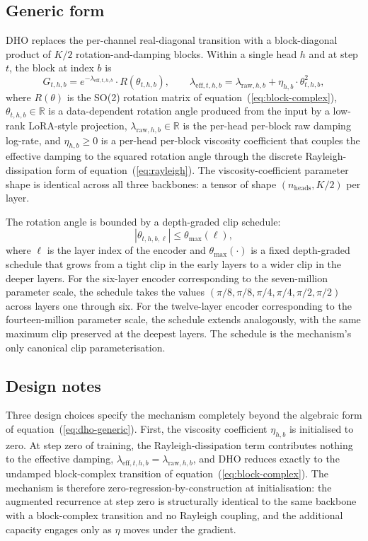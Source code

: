 \subsection{Generic form}

DHO replaces the per-channel real-diagonal transition with a
block-diagonal product of $K/2$ rotation-and-damping blocks. Within
a single head $h$ and at step $t$, the block at index $b$ is
\begin{equation}\label{eq:dho-generic}
G_{t, h, b} = e^{-\lambda_{\mathrm{eff}, t, h, b}} \cdot R(\theta_{t, h, b}),
\qquad
\lambda_{\mathrm{eff}, t, h, b} = \lambda_{\mathrm{raw}, h, b} + \eta_{h, b} \cdot \theta_{t, h, b}^{2},
\end{equation}
where $R(\theta)$ is the SO(2) rotation matrix of
equation~(\ref{eq:block-complex}), $\theta_{t, h, b} \in \mathbb{R}$
is a data-dependent rotation angle produced from the input by a
low-rank LoRA-style projection, $\lambda_{\mathrm{raw}, h, b} \in \mathbb{R}$
is the per-head per-block raw damping log-rate, and
$\eta_{h, b} \ge 0$ is a per-head per-block viscosity coefficient
that couples the effective damping to the squared rotation angle
through the discrete Rayleigh-dissipation form of
equation~(\ref{eq:rayleigh}). The viscosity-coefficient parameter
shape is identical across all three backbones: a tensor of shape
$(n_{\mathrm{heads}}, K/2)$ per layer.

The rotation angle is bounded by a depth-graded clip schedule:
\begin{equation}\label{eq:dho-clip}
|\theta_{t, h, b, \ell}| \le \theta_{\max}(\ell),
\end{equation}
where $\ell$ is the layer index of the encoder and
$\theta_{\max}(\cdot)$ is a fixed depth-graded schedule that grows
from a tight clip in the early layers to a wider clip in the deeper
layers. For the six-layer encoder corresponding to the seven-million
parameter scale, the schedule takes the values
$(\pi/8, \pi/8, \pi/4, \pi/4, \pi/2, \pi/2)$ across layers one
through six. For the twelve-layer encoder corresponding to the
fourteen-million parameter scale, the schedule extends analogously,
with the same maximum clip preserved at the deepest layers. The
schedule is the mechanism's only canonical clip parameterisation.

\subsection{Design notes}

Three design choices specify the mechanism completely beyond the
algebraic form of equation~(\ref{eq:dho-generic}). First, the
viscosity coefficient $\eta_{h, b}$ is initialised to zero. At step
zero of training, the Rayleigh-dissipation term contributes nothing
to the effective damping,
$\lambda_{\mathrm{eff}, t, h, b} = \lambda_{\mathrm{raw}, h, b}$,
and DHO reduces exactly to the undamped block-complex transition of
equation~(\ref{eq:block-complex}). The mechanism is therefore
zero-regression-by-construction at initialisation: the augmented
recurrence at step zero is structurally identical to the same
backbone with a block-complex transition and no Rayleigh coupling,
and the additional capacity engages only as $\eta$ moves under the
gradient.

